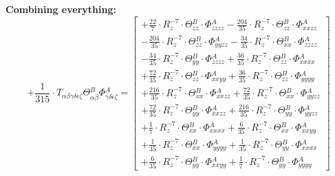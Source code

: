 \documentclass{article}
\begin{document}
\textbf{Combining everything:}
\begin{equation}
+ \frac{1}{315} \cdot T_{\alpha{}\beta{}\gamma{}\delta{}\epsilon{}\zeta{}} \Theta{}^{B}_{\alpha{}\beta{}} \Phi{}^{A}_{\gamma{}\delta{}\epsilon{}\zeta{}} =  \left[ \begin{array}{c} 
 		+ \frac{22}{7} \cdot R_{z}^{-7} \cdot \Theta{}^{B}_{zz} \cdot \Phi{}^{A}_{zzzz}- \frac{204}{35} \cdot R_{z}^{-7} \cdot \Theta{}^{B}_{zz} \cdot \Phi{}^{A}_{xxzz} 
 \\[0.2em] 		 - \frac{204}{35} \cdot R_{z}^{-7} \cdot \Theta{}^{B}_{zz} \cdot \Phi{}^{A}_{yyzz}- \frac{34}{35} \cdot R_{z}^{-7} \cdot \Theta{}^{B}_{xx} \cdot \Phi{}^{A}_{zzzz} 
 \\[0.2em] 		 - \frac{34}{35} \cdot R_{z}^{-7} \cdot \Theta{}^{B}_{yy} \cdot \Phi{}^{A}_{zzzz}+ \frac{36}{35} \cdot R_{z}^{-7} \cdot \Theta{}^{B}_{zz} \cdot \Phi{}^{A}_{xxxx} 
 \\[0.2em] 		 + \frac{72}{35} \cdot R_{z}^{-7} \cdot \Theta{}^{B}_{zz} \cdot \Phi{}^{A}_{xxyy}+ \frac{36}{35} \cdot R_{z}^{-7} \cdot \Theta{}^{B}_{zz} \cdot \Phi{}^{A}_{yyyy} 
 \\[0.2em] 		 + \frac{216}{35} \cdot R_{z}^{-7} \cdot \Theta{}^{B}_{xx} \cdot \Phi{}^{A}_{xxzz}+ \frac{72}{35} \cdot R_{z}^{-7} \cdot \Theta{}^{B}_{xx} \cdot \Phi{}^{A}_{yyzz} 
 \\[0.2em] 		 + \frac{72}{35} \cdot R_{z}^{-7} \cdot \Theta{}^{B}_{yy} \cdot \Phi{}^{A}_{xxzz}+ \frac{216}{35} \cdot R_{z}^{-7} \cdot \Theta{}^{B}_{yy} \cdot \Phi{}^{A}_{yyzz} 
 \\[0.2em] 		 + \frac{1}{7} \cdot R_{z}^{-7} \cdot \Theta{}^{B}_{xx} \cdot \Phi{}^{A}_{xxxx}+ \frac{6}{35} \cdot R_{z}^{-7} \cdot \Theta{}^{B}_{xx} \cdot \Phi{}^{A}_{xxyy} 
 \\[0.2em] 		 + \frac{1}{35} \cdot R_{z}^{-7} \cdot \Theta{}^{B}_{xx} \cdot \Phi{}^{A}_{yyyy}+ \frac{1}{35} \cdot R_{z}^{-7} \cdot \Theta{}^{B}_{yy} \cdot \Phi{}^{A}_{xxxx} 
 \\[0.2em] 		 + \frac{6}{35} \cdot R_{z}^{-7} \cdot \Theta{}^{B}_{yy} \cdot \Phi{}^{A}_{xxyy}+ \frac{1}{7} \cdot R_{z}^{-7} \cdot \Theta{}^{B}_{yy} \cdot \Phi{}^{A}_{yyyy}
 \end{array}\right] 
\end{equation}
\end{document}

